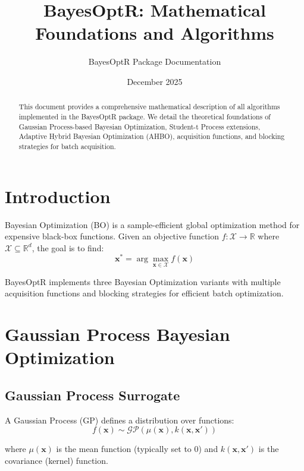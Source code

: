 \documentclass[11pt,a4paper]{article}
\title{BayesOptR: Mathematical Foundations and Algorithms}
\author{BayesOptR Package Documentation}
\date{December 2025}
\begin{document}
\maketitle

\begin{abstract}
This document provides a comprehensive mathematical description of all algorithms implemented in the BayesOptR package. We detail the theoretical foundations of Gaussian Process-based Bayesian Optimization, Student-t Process extensions, Adaptive Hybrid Bayesian Optimization (AHBO), acquisition functions, and blocking strategies for batch acquisition.
\end{abstract}

\tableofcontents
\newpage

\section{Introduction}

Bayesian Optimization (BO) is a sample-efficient global optimization method for expensive black-box functions. Given an objective function $f: \mathcal{X} \rightarrow \mathbb{R}$ where $\mathcal{X} \subseteq \mathbb{R}^d$, the goal is to find:
\begin{equation}
    \mathbf{x}^* = \arg\max_{\mathbf{x} \in \mathcal{X}} f(\mathbf{x})
\end{equation}

BayesOptR implements three Bayesian Optimization variants with multiple acquisition functions and blocking strategies for efficient batch optimization.

\section{Gaussian Process Bayesian Optimization}

\subsection{Gaussian Process Surrogate}

A Gaussian Process (GP) defines a distribution over functions:
\begin{equation}
    f(\mathbf{x}) \sim \mathcal{GP}(\mu(\mathbf{x}), k(\mathbf{x}, \mathbf{x}'))
\end{equation}

where $\mu(\mathbf{x})$ is the mean function (typically set to 0) and $k(\mathbf{x}, \mathbf{x}')$ is the covariance (kernel) function.
\end{document}
